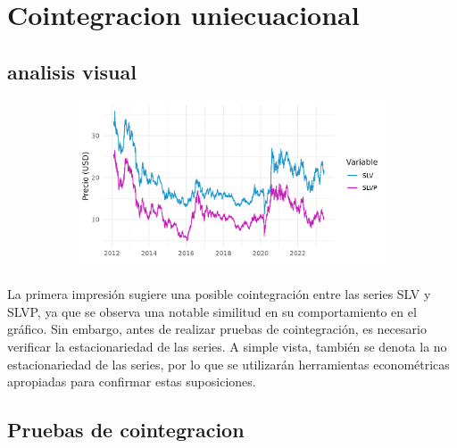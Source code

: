 \documentclass[11pt]{article}
\begin{document}
\section{Cointegracion uniecuacional}
\subsection{analisis visual}
\begin{flushleft}
    \begin{center}
    \begin{figure}[!ht]
      \centering
      \includegraphics[width=12cm, height=5cm]{Imagenes/ts.png}
      \vspace{0cm}
    \end{figure}
  \end{center}
La primera impresión sugiere una posible cointegración entre las series SLV y SLVP, ya que se observa una notable similitud en su comportamiento en el gráfico. Sin embargo, antes de realizar pruebas de cointegración, es necesario verificar la estacionariedad de las series. A simple vista, también se denota la no estacionariedad de las series, por lo que se utilizarán herramientas econométricas apropiadas para confirmar estas suposiciones.
\end{flushleft}

\subsection{Pruebas de cointegracion}
\end{document}
